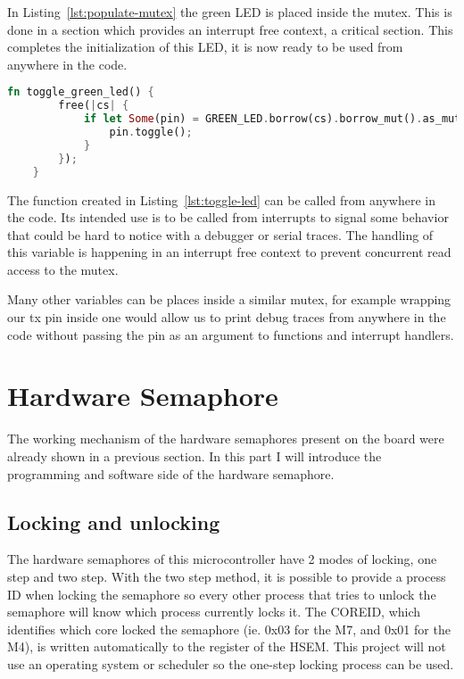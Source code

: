 In Listing~\ref{lst:populate-mutex} the green LED is placed inside the mutex. This is done in a  section which provides an interrupt free context, a critical section. This completes the initialization of this LED, it is now ready to be used from anywhere in the code.

\begin{lstlisting}[language=Rust,frame=single,float=!ht,style=customrust,label={lst:toggle-led},caption={A LED Toggle Function}]
    fn toggle_green_led() {
        free(|cs| {
            if let Some(pin) = GREEN_LED.borrow(cs).borrow_mut().as_mut() {
                pin.toggle();
            }
        });
    }
\end{lstlisting}

The function created in Listing~\ref{lst:toggle-led} can be called from anywhere in the code. Its intended use is to be called from interrupts to signal some behavior that could be hard to notice with a debugger or serial traces. The handling of this variable is happening in an interrupt free context to prevent concurrent read access to the mutex.

Many other variables can be places inside a similar mutex, for example wrapping our tx pin inside one would allow us to print debug traces from anywhere in the code without passing the pin as an argument to functions and interrupt handlers.

\section{Hardware Semaphore}

The working mechanism of the hardware semaphores present on the board were already shown in a previous section. In this part I will introduce the programming and software side of the hardware semaphore.

\subsection{Locking and unlocking}

The hardware semaphores of this microcontroller have 2 modes of locking, one step and two step. With the two step method, it is possible to provide a process ID when locking the semaphore so every other process that tries to unlock the semaphore will know which process currently locks it. The COREID, which identifies which core locked the semaphore (ie. 0x03 for the M7, and 0x01 for the M4), is written automatically to the register of the HSEM. This project will not use an operating system or scheduler so the one-step locking process can be used.

